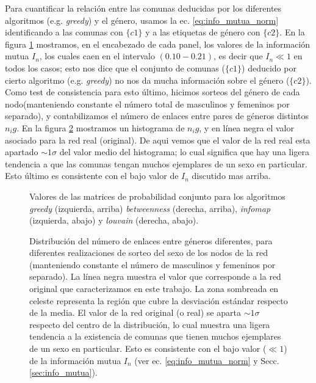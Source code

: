 Para cuantificar la relaci\'on entre las comunas deducidas por los diferentes algoritmos (e.g. {\it greedy}) y el g\'enero, usamos la ec. \ref{eq:info_mutua_norm} identificando a las comunas con $\{c1\}$ y a las etiquetas de g\'enero con $\{c2\}$.
En la figura \ref{fig:prob_conj} mostramos, en el encabezado de cada panel, los valores de la informaci\'on mutua $I_n$, los cuales caen en el intervalo $(0.10 - 0.21)$, es decir que $I_n \ll 1$ en todos los casos; esto nos dice que el conjunto de comunas ($\{c1\}$) deducido por cierto algoritmo (e.g. {\it greedy}) no nos da mucha informaci\'on sobre el g\'enero ($\{c2\}$).
Como test de consistencia para esto  \'ultimo, hicimos sorteos del g\'enero de cada nodo(manteniendo constante el n\'umero total de masculinos y femeninos por separado), y contabilizamos el n\'umero de enlaces entre pares de g\'eneros distintos $n_ig$.
En la figura \ref{fig:hist_sort_sex} mostramos un histograma de $n_ig$, y en l\'inea negra el valor asociado para la red real (original).
De aqui vemos que el valor de la red real esta apartado $\sim 1 \sigma$ del valor medio del histograma; lo cual significa que hay una ligera tendencia a que las comunas tengan muchos ejemplares de un sexo en particular.
Esto \'ultimo es consistente con el bajo valor de $I_n$ discutido mas arriba.


\begin{figure}
    \centering
    \caption{
    Valores de las matrices de probabilidad conjunto para los algoritmos {\it greedy} (izquierda, arriba) {\it betweenness} (derecha, arriba), {\it infomap} (izquierda, abajo) y {\it louvain} (derecha, abajo). 
    }
\label{fig:prob_conj}
\end{figure}


\begin{figure}
    \centering
    \caption{
    Distribuci\'on del n\'umero de enlaces entre g\'eneros diferentes, para diferentes realizaciones de sorteo del sexo de los nodos de la red (manteniendo constante el n\'umero de masculinos y femeninos por separado).
    La l\'inea negra muestra el valor que corresponde a la red original que caracterizamos en este trabajo.
    La zona sombreada en celeste representa la regi\'on que cubre la desviaci\'on est\'andar respecto de la media.
    El valor de la red original (o real) se aparta $\sim 1 \sigma$ respecto del centro de la distribuci\'on, lo cual muestra una ligera tendencia a la existencia de comunas que tienen muchos ejemplares de un sexo en particular.
    Esto es consistente con el bajo valor ($\ll 1$) de la informaci\'on mutua $I_n$ (ver ec. \ref{eq:info_mutua_norm} y Secc. \ref{sec:info_mutua}).
    }
\label{fig:hist_sort_sex}
\end{figure}

